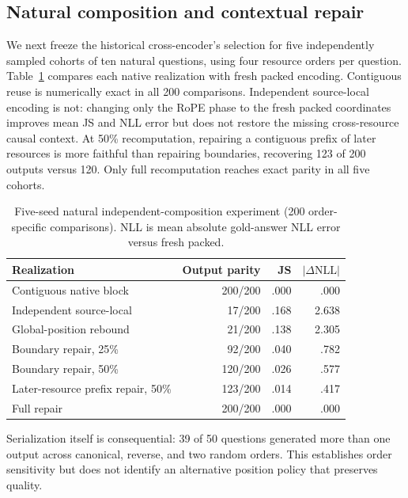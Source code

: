\documentclass[11pt]{article}
\begin{document}
\subsection{Natural composition and contextual repair}
We next freeze the historical cross-encoder's selection for five independently
sampled cohorts of ten natural questions, using four resource orders per
question. Table~\ref{tab:composition}
compares each native realization with fresh packed encoding. Contiguous reuse
is numerically exact in all 200 comparisons. Independent source-local encoding
is not: changing only the RoPE phase to the fresh packed coordinates improves
mean JS and NLL error but does not restore the missing cross-resource causal
context. At 50\% recomputation, repairing a contiguous prefix of later
resources is more faithful than repairing boundaries, recovering 123 of 200
outputs versus 120. Only full recomputation reaches exact parity in all five
cohorts.

\begin{table}[ht]
\centering
\caption{Five-seed natural independent-composition experiment (200
order-specific comparisons). NLL is mean absolute gold-answer NLL error versus
fresh packed.}
\label{tab:composition}
\small
\begin{tabular}{lrrr}
\toprule
Realization & Output parity & JS & $|\Delta\mathrm{NLL}|$ \\
\midrule
Contiguous native block & 200/200 & .000 & .000 \\
Independent source-local & 17/200 & .168 & 2.638 \\
Global-position rebound & 21/200 & .138 & 2.305 \\
Boundary repair, 25\% & 92/200 & .040 & .782 \\
Boundary repair, 50\% & 120/200 & .026 & .577 \\
Later-resource prefix repair, 50\% & 123/200 & .014 & .417 \\
Full repair & 200/200 & .000 & .000 \\
\bottomrule
\end{tabular}
\end{table}

Serialization itself is consequential: 39 of 50 questions generated more than
one output across canonical, reverse, and two random orders. This establishes
order sensitivity but does not identify an alternative position policy that
preserves quality.
\end{document}
